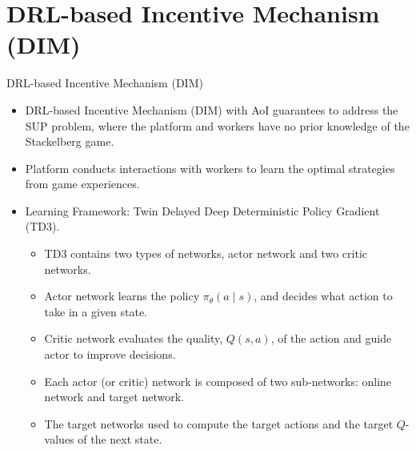 \documentclass[aspectratio=169,xcolor=dvipsnames]{beamer}
\begin{document}
\section{DRL-based Incentive Mechanism (DIM)}
\begin{frame}[fragile]{DRL-based Incentive Mechanism (DIM)}
    \footnotesize %
    \begin{itemize}[<+-| alert@+>]
        \setlength{\itemsep}{1em} %
        \item DRL-based Incentive Mechanism (DIM) with AoI guarantees to address the SUP problem, where the platform and workers have no prior knowledge of the Stackelberg game.
        \item Platform conducts interactions with workers to learn the optimal strategies from game experiences.\\
        \item Learning Framework: Twin Delayed Deep Deterministic Policy Gradient (TD3).
        \vspace{0.3}
        \begin{itemize}
        \footnotesize
            \setlength{\itemsep}{0.5em} %
            \item TD3 contains two types of networks, actor network and two critic networks.
            \item Actor network learns the policy $\pi_{\theta}(a \mid s)$, and decides what action to take in a given state.
            \item Critic network evaluates the quality, $Q(s, a)$, of the action and guide actor to improve decisions.
            \item Each actor (or critic) network is composed of two sub-networks: online network and target network. 
            \item The target networks used to compute the target actions and the target $Q$-values of the next state. 
        \end{itemize}
    \end{itemize}     
\end{frame}
\end{document}

